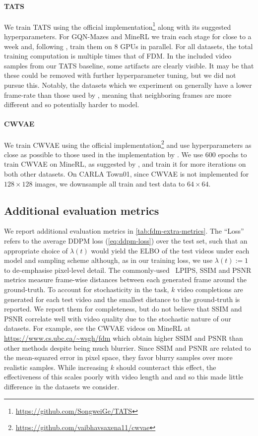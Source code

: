 \paragraph{TATS}
We train TATS using the official implementation\footnote{\url{https://github.com/SongweiGe/TATS}} along with its suggested hyperparameters. For GQN-Mazes and MineRL we train each stage for close to a week and, following \citet{ge2022long}, train them on 8 GPUs in parallel. For all datasets, the total training computation is multiple times that of FDM. In the included video samples from our TATS baseline, some artifacts are clearly visible. It may be that these could be removed with further hyperparameter tuning, but we did not pursue this. Notably, the datasets which we experiment on generally have a lower frame-rate than those used by \citet{ge2022long}, meaning that neighboring frames are more different and so potentially harder to model.

\paragraph{CWVAE}
We train CWVAE using the official implementation\footnote{\url{https://github.com/vaibhavsaxena11/cwvae}} and use hyperparameters as close as possible to those used in the implementation by \citet{saxena2021clockwork}. We use 600 epochs to train CWVAE on MineRL, as suggested by \citet{saxena2021clockwork}, and train it for more iterations on both other datasets. On CARLA Town01, since CWVAE is not implemented for $128\times128$ images, we downsample all train and test data to $64\times64$.

\subsection{Additional evaluation metrics}
We report additional evaluation metrics in \cref{tab:fdm-extra-metrics}. The ``Loss'' refers to the average DDPM loss (\cref{eq:ddpm-loss}) over the test set, such that an appropriate choice of $\lambda(t)$ would yield the ELBO of the test videos under each model and sampling scheme although, as in our training loss, we use $\lambda(t):=1$ to de-emphasise pixel-level detail. The commonly-used~\citep{saxena2021clockwork,babaeizadeh2021fitvid} LPIPS, SSIM and PSNR metrics measure frame-wise distances between each generated frame around the ground-truth. To account for stochasticity in the task, $k$ video completions are generated for each test video and the smallest distance to the ground-truth is reported. We report them for completeness, but do not believe that SSIM and PSNR correlate well with video quality due to the stochastic nature of our datasets. For example, see the CWVAE videos on MineRL at \url{https://www.cs.ubc.ca/~wsgh/fdm} which obtain higher SSIM and PSNR than other methods despite being much blurrier. Since SSIM and PSNR are related to the mean-squared error in pixel space, they favor blurry samples over more realistic samples. While increasing $k$ should counteract this effect, the effectiveness of this scales poorly with video length and and so this made little difference in the datasets we consider.


